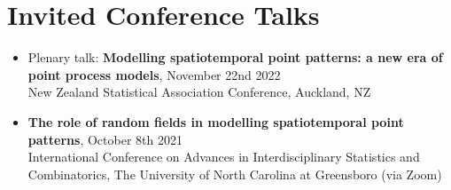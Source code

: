 \documentclass[10pt,a4paper]{moderncv}
\begin{document}
\section*{Invited Conference Talks}

\begin{itemize}
  
    
    
    \item Plenary talk: \textbf{Modelling spatiotemporal point patterns: a new era of point process models}, November 22nd 2022\\
    { New Zealand Statistical Association Conference, Auckland, NZ}
    
    
    \item \textbf{The role of random fields in modelling spatiotemporal point patterns}, October 8th 2021\\
    { International Conference on Advances in Interdisciplinary Statistics and Combinatorics, The University of North Carolina at Greensboro (via Zoom)}
    
    
    

\end{itemize}
\end{document}
